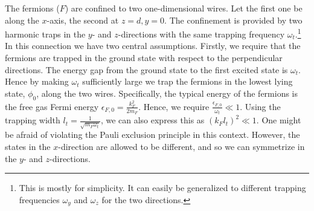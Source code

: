 The fermions ($F$) are confined to two one-dimensional wires. Let the first one be along the $x$-axis, the second at $z = d, y = 0$. The confinement is provided by two harmonic traps in the $y$- and $z$-directions with the same trapping frequency $\omega_t$.\footnote{This is mostly for simplicity. It can easily be generalized to different trapping frequencies $\omega_y$ and $\omega_z$ for the two directions.} In this connection we have two central assumptions. Firstly, we require that the fermions are trapped in the ground state with respect to the perpendicular directions. The energy gap from the ground state to the first excited state is $\omega_t$. Hence by making $\omega_t$ sufficiently large we trap the fermions in the lowest lying state, $\phi_0$, along the two wires. Specifically, the typical energy of the fermions is the free gas Fermi energy $\epsilon_{F,0} = \frac{k_F^2}{2m_F}$. Hence, we require $\frac{\epsilon_{F,0}}{\omega_t} \ll 1$. Using the trapping width $l_t = \frac{1}{\sqrt{m_F\omega_t}}$, we can also express this as $(k_Fl_t)^2 \ll 1$. One might be afraid of violating the Pauli exclusion principle in this context. However, the states in the $x$-direction are allowed to be different, and so we can symmetrize in the $y$- and $z$-directions.

